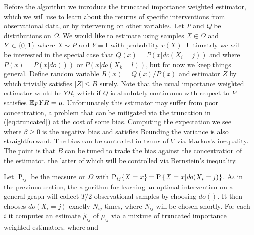 Before the algorithm we introduce the truncated importance weighted estimator, which we will use to learn about the returns of 
specific interventions from observational data, or by intervening on other variables. Let $P$ and $Q$ be distributions on $\Omega$.
We would like to estimate
using samples $X \in \Omega$ and $Y \in \left\{0,1\right\}$ where $X \sim P$ and $Y = 1$ with probability $r(X)$. Ultimately we will be interested
in the special case that $Q(x) = P(x|do(X_i = j))$ and where $P(x) = P(x|do())$ or $P(x|do(X_k = l))$, but for now we keep things general.
Define random variable $R(x) = Q(x)/P(x)$ and estimator $Z$ by
which trivially satisfies $|Z| \leq B$ surely.
Note that the usual importance weighted estimator would be $YR$, which if $Q$ is absolutely continuous with respect to $P$ satisfies $\mathbb E_P YR = \mu$. Unfortunately
this estimator may suffer from poor concentration, a problem that can be mitigated via the truncation in (\ref{eq:truncated}) at the cost of some bias.
Computing the expectation we see
where $\beta \geq 0$ is the negative bias and satisfies
Bounding the variance is also straightforward.
The bias can be controlled in terms of $V$ via Markov's inequality.
The point is that $B$ can be tuned to trade the bias against the concentration of the estimator,
the latter of which will be controlled via Bernstein's inequality. 

Let $\operatorname P_{ij}$ be the measure on $\Omega$ with $\operatorname{P}_{ij}\!\left\{X = x\right\} = \operatorname{P}\left\{X = x|do(X_i = j)\right\}$.
As in the previous section, the algorithm for learning an optimal intervention on a general graph will 
collect $T/2$ observational samples by choosing $do()$. It then chooses $do(X_i = j)$ 
exactly $N_{ij}$ times, where $N_{ij}$ will be chosen shortly. For each $i$ it computes an estimate $\hat \mu_{ij}$ of $\mu_{ij}$ via
a mixture of truncated importance weighted estimators.
where 
and

